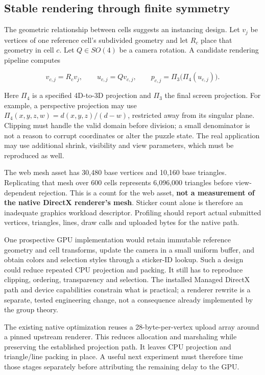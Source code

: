 \documentclass[
  10pt,
  a4paper,
]{article}
\begin{document}
\subsection{Stable rendering through finite
symmetry}\label{stable-rendering-through-finite-symmetry}

The geometric relationship between cells suggests an instancing design.
Let \(v_j\) be vertices of one reference cell's subdivided geometry and
let \(R_c\) place that geometry in cell \(c\). Let \(Q\in SO(4)\) be a
camera rotation. A candidate rendering pipeline computes

\begin{equation}
v_{c,j}=R_cv_j,\qquad u_{c,j}=Qv_{c,j},\qquad
p_{c,j}=\Pi_3\bigl(\Pi_4(u_{c,j})\bigr).
\end{equation}

Here \(\Pi_4\) is a specified 4D-to-3D projection and \(\Pi_3\) the
final screen projection. For example, a perspective projection may use
\(\Pi_4(x,y,z,w)=d(x,y,z)/(d-w)\), restricted away from its singular
plane. Clipping must handle the valid domain before division; a small
denominator is not a reason to corrupt coordinates or alter the puzzle
state. The real application may use additional shrink, visibility and
view parameters, which must be reproduced as well.

The web mesh asset has 30,480 base vertices and 10,160 base triangles.
Replicating that mesh over 600 cells represents 6,096,000 triangles
before view-dependent rejection. This is a count for the web asset,
\textbf{not a measurement of the native DirectX renderer's mesh}.
Sticker count alone is therefore an inadequate graphics workload
descriptor. Profiling should report actual submitted vertices,
triangles, lines, draw calls and uploaded bytes for the native path.

One prospective GPU implementation would retain immutable reference
geometry and cell transforms, update the camera in a small uniform
buffer, and obtain colors and selection styles through a sticker-ID
lookup. Such a design could reduce repeated CPU projection and packing.
It still has to reproduce clipping, ordering, transparency and
selection. The installed Managed DirectX path and device capabilities
constrain what is practical; a renderer rewrite is a separate, tested
engineering change, not a consequence already implemented by the group
theory.

The existing native optimization reuses a 28-byte-per-vertex upload
array around a pinned upstream renderer. This reduces allocation and
marshaling while preserving the established projection path. It leaves
CPU projection and triangle/line packing in place. A useful next
experiment must therefore time those stages separately before
attributing the remaining delay to the GPU.
\end{document}
